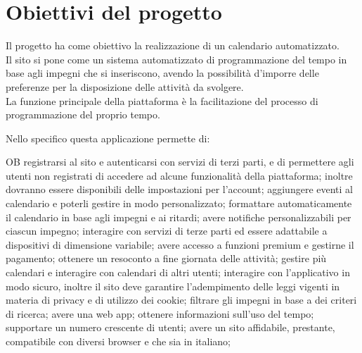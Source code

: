 \section{Obiettivi del progetto}
\label{sec:ObiettiviProgetto}
Il progetto ha come obiettivo la realizzazione di un calendario automatizzato.\\
Il sito si pone come un sistema automatizzato di programmazione del tempo in base agli impegni che si inseriscono, avendo la possibilità d'imporre delle preferenze per la disposizione delle attività da svolgere.\\
La funzione principale della piattaforma è la facilitazione del processo di programmazione del proprio tempo.

\vspace{0.5cm}

Nello specifico questa applicazione permette di:
\begin{listaPersonale}{OB}
       registrarsi al sito e autenticarsi con servizi di terzi parti, e di permettere agli utenti non registrati di accedere ad alcune funzionalità della piattaforma; inoltre dovranno essere disponibili delle impostazioni per l'account;
       aggiungere eventi al calendario e poterli gestire in modo personalizzato;
       formattare automaticamente il calendario in base agli impegni e ai ritardi;
       avere notifiche personalizzabili per ciascun impegno;
       interagire con servizi di terze parti ed essere adattabile a dispositivi di dimensione variabile;
       avere accesso a funzioni premium e gestirne il pagamento;
       ottenere un resoconto a fine giornata delle attività;
       gestire più calendari e interagire con calendari di altri utenti;
       interagire con l'applicativo in modo sicuro, inoltre il sito deve garantire l'adempimento delle leggi vigenti in materia di privacy e di utilizzo dei cookie;
       filtrare gli impegni in base a dei criteri di ricerca;
       avere una web app;
       ottenere informazioni sull'uso del tempo;
       supportare un numero crescente di utenti;
       avere un sito affidabile, prestante, compatibile con diversi browser e che sia in italiano;
\end{listaPersonale}
